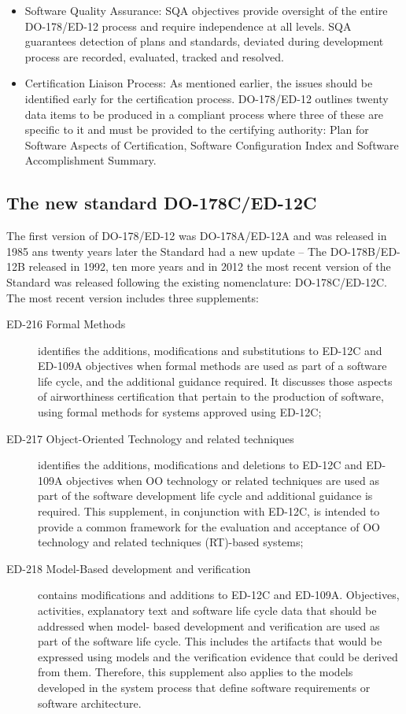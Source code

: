 {\begin{description}
\begin{itemize}
or configuration is the design of the DO-178/ED-12 objectives
for configuration management.
\item Software Quality Assurance: \ac{SQA} objectives provide oversight of the entire DO-178/ED-12
process and require independence at all levels. \ac{SQA} guarantees
detection of plans and standards, deviated during development
process are recorded, evaluated, tracked and resolved.
\item Certification Liaison Process: As mentioned earlier, the
issues should be identified early for the certification process.
DO-178/ED-12 outlines twenty data items to be produced in a
compliant process where three of these are specific to it and
must be provided to the certifying authority: Plan for Software Aspects of Certification, Software Configuration Index and Software Accomplishment Summary.
\end{itemize}
\end{description}
\subsection{The new standard DO-178C/ED-12C}
The first version of DO-178/ED-12 was DO-178A/ED-12A and was released in 1985 ans twenty years later the Standard had a new update -- The DO-178B/ED-12B released in 1992,
ten more years and in 2012 the most recent version of the Standard was released following the existing nomenclature: DO-178C/ED-12C.
The most recent version includes three supplements: 
\begin{description}
\item[ED-216 Formal Methods] identifies the additions, modifications and substitutions to ED-12C and ED-109A objectives when formal methods are used as part of a software life cycle, and the additional guidance required. It discusses those aspects of airworthiness certification that pertain to the production of software, using formal methods for systems approved using ED-12C;
\item[ED-217 Object-Oriented Technology and related techniques] identifies the additions, modifications and deletions to ED-12C and ED-109A objectives when \ac{OO} technology or related techniques are used as part of the software development life cycle and additional guidance is required. This supplement, in conjunction with ED-12C, is intended to provide a common framework for the evaluation and acceptance of \ac{OO} technology and related techniques (RT)-based systems;
\item[ED-218 Model-Based development and verification] contains modifications and additions to ED-12C and ED-109A. Objectives, activities, explanatory text and software life cycle data that should be addressed when model- based development and verification are used as part of the software life cycle. This includes the artifacts that would be expressed using models and the verification evidence that could be derived from them. Therefore, this supplement also applies to the models developed in the system process that define software requirements or software architecture.
\end{description}

}
